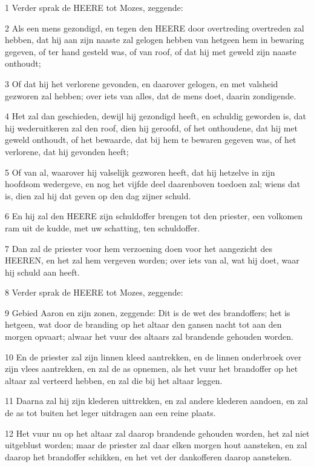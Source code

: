 \par 1 Verder sprak de HEERE tot Mozes, zeggende:
\par 2 Als een mens gezondigd, en tegen den HEERE door overtreding overtreden zal hebben, dat hij aan zijn naaste zal gelogen hebben van hetgeen hem in bewaring gegeven, of ter hand gesteld was, of van roof, of dat hij met geweld zijn naaste onthoudt;
\par 3 Of dat hij het verlorene gevonden, en daarover gelogen, en met valsheid gezworen zal hebben; over iets van alles, dat de mens doet, daarin zondigende.
\par 4 Het zal dan geschieden, dewijl hij gezondigd heeft, en schuldig geworden is, dat hij wederuitkeren zal den roof, dien hij geroofd, of het onthoudene, dat hij met geweld onthoudt, of het bewaarde, dat bij hem te bewaren gegeven was, of het verlorene, dat hij gevonden heeft;
\par 5 Of van al, waarover hij valselijk gezworen heeft, dat hij hetzelve in zijn hoofdsom wedergeve, en nog het vijfde deel daarenboven toedoen zal; wiens dat is, dien zal hij dat geven op den dag zijner schuld.
\par 6 En hij zal den HEERE zijn schuldoffer brengen tot den priester, een volkomen ram uit de kudde, met uw schatting, ten schuldoffer.
\par 7 Dan zal de priester voor hem verzoening doen voor het aangezicht des HEEREN, en het zal hem vergeven worden; over iets van al, wat hij doet, waar hij schuld aan heeft.
\par 8 Verder sprak de HEERE tot Mozes, zeggende:
\par 9 Gebied Aaron en zijn zonen, zeggende: Dit is de wet des brandoffers; het is hetgeen, wat door de branding op het altaar den gansen nacht tot aan den morgen opvaart; alwaar het vuur des altaars zal brandende gehouden worden.
\par 10 En de priester zal zijn linnen kleed aantrekken, en de linnen onderbroek over zijn vlees aantrekken, en zal de as opnemen, als het vuur het brandoffer op het altaar zal verteerd hebben, en zal die bij het altaar leggen.
\par 11 Daarna zal hij zijn klederen uittrekken, en zal andere klederen aandoen, en zal de as tot buiten het leger uitdragen aan een reine plaats.
\par 12 Het vuur nu op het altaar zal daarop brandende gehouden worden, het zal niet uitgeblust worden; maar de priester zal daar elken morgen hout aansteken, en zal daarop het brandoffer schikken, en het vet der dankofferen daarop aansteken.
